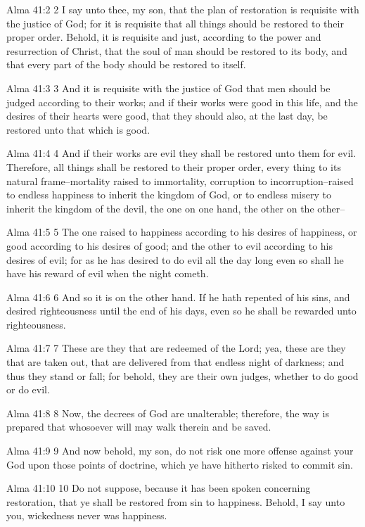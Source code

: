 Alma 41:2
 2 I say unto thee, my son, that the plan of restoration is
requisite with the justice of God; for it is requisite that all
things should be restored to their proper order. Behold, it is
requisite and just, according to the power and resurrection of
Christ, that the soul of man should be restored to its body, and
that every part of the body should be restored to itself.

Alma 41:3
 3 And it is requisite with the justice of God that men should be
judged according to their works; and if their works were good in
this life, and the desires of their hearts were good, that they
should also, at the last day, be restored unto that which is
good.

Alma 41:4
 4 And if their works are evil they shall be restored unto them
for evil. Therefore, all things shall be restored to their
proper order, every thing to its natural frame--mortality raised
to immortality, corruption to incorruption--raised to endless
happiness to inherit the kingdom of God, or to endless misery to
inherit the kingdom of the devil, the one on one hand, the other
on the other--

Alma 41:5
 5 The one raised to happiness according to his desires of
happiness, or good according to his desires of good; and the
other to evil according to his desires of evil; for as he has
desired to do evil all the day long even so shall he have his
reward of evil when the night cometh.

Alma 41:6
 6 And so it is on the other hand. If he hath repented of his
sins, and desired righteousness until the end of his days, even
so he shall be rewarded unto righteousness.

Alma 41:7
 7 These are they that are redeemed of the Lord; yea, these are
they that are taken out, that are delivered from that endless
night of darkness; and thus they stand or fall; for behold, they
are their own judges, whether to do good or do evil.

Alma 41:8
 8 Now, the decrees of God are unalterable; therefore, the way is
prepared that whosoever will may walk therein and be saved.

Alma 41:9
 9 And now behold, my son, do not risk one more offense against
your God upon those points of doctrine, which ye have hitherto
risked to commit sin.

Alma 41:10
 10 Do not suppose, because it has been spoken concerning
restoration, that ye shall be restored from sin to happiness.
Behold, I say unto you, wickedness never was happiness.

